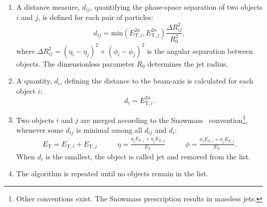 \begin{enumerate}
	\item A distance measure, $d_{ij}$, quantifying the phase-space separation of two objects $i$ and $j$, is defined for each pair of particles:
	\begin{equation}
	  d_{ij} = \mathrm{\text{min}} \left( E_{\text{T},i}^{2n}, E_{\text{T},j}^{2n} \right) \dfrac{\Delta R_{ij}^2}{R_0^2},
		\label{eq:dij}
	\end{equation}
	where $\Delta R_{ij}^2 = \left( \eta_{i} - \eta_{j} \right)^2 + \left( \phi_{i} - \phi_{j} \right)^2$ is the angular separation between objects. The dimensionless parameter $R_0$ determines the jet radius.
	\item A quantity, $d_i$, defining the distance to the beam-axis is calculated for each object $i$:
		\begin{equation}
	  d_{i} = E_{\text{T},i}^{2n}.
		\label{eq:di}
	\end{equation}
	\item Two objects $i$ and $j$ are merged according to the Snowmass~\cite{proc:snowmass:1990:134} convention\footnote{Other conventions exist. The Snowmass prescription results in massless jets.}, whenever some $d_{ij}$ is minimal among all $d_{ij}$ and $d_{i}$:
	\begin{align}
		E_\text{T} = E_{\text{T},i} + E_{\text{T},j} & \qquad \eta = \frac{\eta_iE_{\text{T},i} + \eta_jE_{\text{T},j}}{E_\text{T}} & \qquad \phi = \frac{\phi_iE_{\text{T},i} + \phi_jE_{\text{T},j}}{E_\text{T}}.			 \label{eq:snowmass}
	\end{align}
	When $d_i$ is the smallest, the object is called jet and removed from the list.
	\item The algorithm is repeated until no objects remain in the list.
\end{enumerate}


